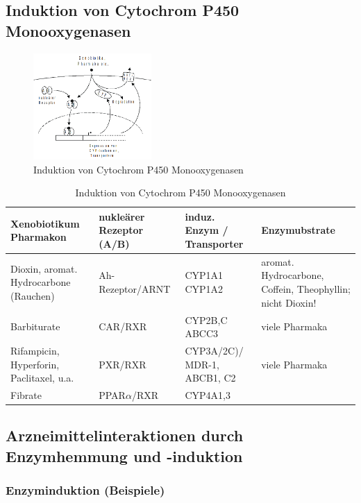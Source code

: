 \documentclass[10pt,a4paper]{report}
\begin{document}
\subsection{Induktion von Cytochrom P450 Monooxygenasen}

\begin{figure}[h]
	\centering 
	\includegraphics[width=0.4\textwidth]{Bilder/CYP2.png} 
	\caption{Induktion von Cytochrom P450 Monooxygenasen} 
	\label{fig:cytochrom2}
\end{figure}

\begin{table}[h]
	\centering
	\begin{tabularx}{\textwidth}{llp{3cm}X}
		\toprule
		Xenobiotikum Pharmakon& nukleärer Rezeptor (A/B)&induz. Enzym / Transporter&Enzymubstrate\\ \midrule
		Dioxin, aromat. Hydrocarbone (Rauchen)& Ah-Rezeptor/ARNT&CYP1A1 CYP1A2&aromat. Hydrocarbone, Coffein, Theophyllin; nicht Dioxin!\\
		Barbiturate&CAR/RXR&CYP2B,C ABCC3&viele Pharmaka\\
		Rifampicin, Hyperforin, Paclitaxel, u.a.&PXR/RXR&CYP3A/2C)/ MDR-1, ABCB1, C2&viele Pharmaka\\
		Fibrate&PPAR$\alpha$/RXR&CYP4A1,3&\\ 
		\bottomrule
	\end{tabularx}
	\caption{Induktion von Cytochrom P450 Monooxygenasen}
\label{tab:cypinduktion}
\end{table}

\subsection{Arzneimittelinteraktionen durch Enzymhemmung und -induktion}

\subsubsection{Enzyminduktion (Beispiele)}
\end{document}
